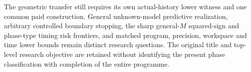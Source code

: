 The geometric transfer still requires its own actual-history lower witness and one common paid construction. General unknown-model predictive realization, arbitrary controlled boundary stopping, the sharp general-$M$ squared-sign and phase-type timing risk frontiers, and matched program, precision, workspace and time lower bounds remain distinct research questions. The original title and top-level research objective are retained without identifying the present phase classification with completion of the entire programme.


